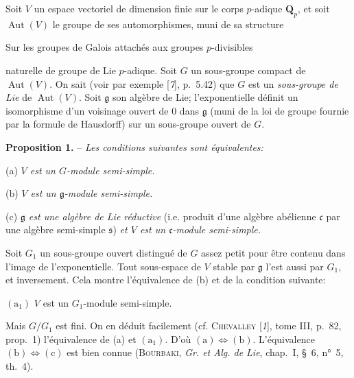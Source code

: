 Soit $V$ un espace vectoriel de dimension finie sur le corps $p$-adique $\mathbf{Q}_p$, et soit $\operatorname{Aut}(V)$ le groupe de ses automorphismes, muni de sa structure
\begin{center}\small Sur les groupes de Galois attachés aux groupes $p$-divisibles\end{center}
naturelle de groupe de Lie $p$-adique. Soit $G$ un sous-groupe compact de $\operatorname{Aut}(V)$. On sait (voir par exemple [\textit{7}], p.~5.42) que $G$ est un \textit{sous-groupe de Lie} de $\operatorname{Aut}(V)$. Soit $\mathfrak{g}$ son algèbre de Lie; l’exponentielle définit un isomorphisme d’un voisinage ouvert de $0$ dans $\mathfrak{g}$ (muni de la loi de groupe fournie par la formule de Hausdorff) sur un sous-groupe ouvert de $G$.

\textbf{Proposition 1.} -- \textit{Les conditions suivantes sont équivalentes:}

(a) \textit{$V$ est un $G$-module semi-simple.}

(b) \textit{$V$ est un $\mathfrak{g}$-module semi-simple.}

(c) \textit{$\mathfrak{g}$ est une algèbre de Lie réductive} (i.e. produit d’une algèbre abélienne $\mathfrak{c}$ par une algèbre semi-simple $\mathfrak{s}$) \textit{et $V$ est un $\mathfrak{c}$-module semi-simple.}

Soit $G_1$ un sous-groupe ouvert distingué de $G$ assez petit pour être contenu dans l’image de l’exponentielle. Tout sous-espace de $V$ stable par $\mathfrak{g}$ l’est aussi par $G_1$, et inversement. Cela montre l’équivalence de (b) et de la condition suivante:

$(\mathrm{a}_1)$ $V$ est un $G_1$-module semi-simple.

Mais $G/G_1$ est fini. On en déduit facilement (cf. \textsc{Chevalley} [\textit{1}], tome III, p.~82, prop.~1) l’équivalence de (a) et $(\mathrm{a}_1)$. D’où $\mathrm{(a)}\Leftrightarrow\mathrm{(b)}$. L’équivalence $\mathrm{(b)}\Leftrightarrow\mathrm{(c)}$ est bien connue (\textsc{Bourbaki}, \textit{Gr. et Alg. de Lie}, chap.~I, \S~6, n°~5, th.~4).

